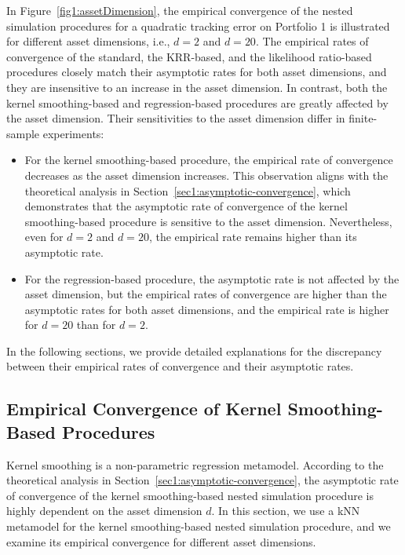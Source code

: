 In Figure~\ref{fig1:assetDimension}, the empirical convergence of the nested simulation procedures for a quadratic tracking error on Portfolio 1 is illustrated for different asset dimensions, i.e., $d = 2$ and $d = 20$.
The empirical rates of convergence of the standard, the KRR-based, and the likelihood ratio-based procedures closely match their asymptotic rates for both asset dimensions, and they are insensitive to an increase in the asset dimension.
In contrast, both the kernel smoothing-based and regression-based procedures are greatly affected by the asset dimension.
Their sensitivities to the asset dimension differ in finite-sample experiments:
\begin{itemize}    
    \item For the kernel smoothing-based procedure, the empirical rate of convergence decreases as the asset dimension increases. 
    This observation aligns with the theoretical analysis in Section~\ref{sec1:asymptotic-convergence}, which demonstrates that the asymptotic rate of convergence of the kernel smoothing-based procedure is sensitive to the asset dimension.
    Nevertheless, even for $d = 2$ and $d = 20$, the empirical rate remains higher than its asymptotic rate.
    \item For the regression-based procedure, the asymptotic rate is not affected by the asset dimension, but the empirical rates of convergence are higher than the asymptotic rates for both asset dimensions, and the empirical rate is higher for $d = 20$ than for $d = 2$.
\end{itemize}
In the following sections, we provide detailed explanations for the discrepancy between their empirical rates of convergence and their asymptotic rates.

\subsection{Empirical Convergence of Kernel Smoothing-Based Procedures} \label{sec1:kernel-smoothing-convergence}

Kernel smoothing is a non-parametric regression metamodel.
According to the theoretical analysis in Section~\ref{sec1:asymptotic-convergence}, the asymptotic rate of convergence of the kernel smoothing-based nested simulation procedure is highly dependent on the asset dimension $d$.
In this section, we use a kNN metamodel for the kernel smoothing-based nested simulation procedure, and we examine its empirical convergence for different asset dimensions.

